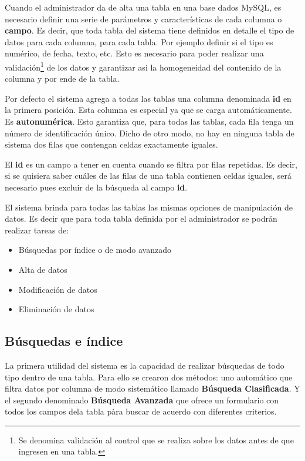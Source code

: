 \documentclass[a4paper,10pt]{article}
\begin{document}
Cuando el administrador da de alta una tabla en una base dados MySQL, es necesario definir una serie de parámetros y características de cada columna o \textbf{campo}. Es decir, que toda tabla del sistema tiene  definidos en detalle el tipo de datos para cada columna, para cada tabla. Por ejemplo definir si el tipo es numérico, de fecha, texto, etc. Esto es necesario para poder realizar una validación\footnote{Se denomina validación al control que se realiza sobre los datos antes de que ingresen en una tabla.} de los datos y garantizar asi la homogeneidad del contenido de la columna y por ende de la tabla.

Por defecto el sistema agrega a todas las tablas una columna denominada \textbf{id} en la primera posición. Esta columna es especial ya que se carga automáticamente. Es \textbf{autonumérica}. Esto garantiza que, para todas las tablas, cada fila tenga un número de identificación único. Dicho de otro modo, no hay en ninguna tabla de sistema dos filas que contengan celdas exactamente iguales.

El \textbf{id} es un campo a tener en cuenta cuando se filtra por filas repetidas. Es decir, si se quisiera saber cuáles de las filas de una tabla contienen celdas iguales, será necesario pues excluir de la búsqueda al campo \textbf{id}.

El sistema brinda para todas las tablas las mismas opciones de manipulación de datos. Es decir que para toda tabla definida por el administrador se podrán realizar tareas de:

\begin{itemize}
 \item Búsquedas por índice o de modo avanzado
 \item Alta de datos
 \item Modificación de datos 
 \item Eliminación de datos
\end{itemize}


\subsection{Búsquedas e índice}

La primera utilidad del sistema es la capacidad de realizar búsquedas de todo tipo dentro de una tabla. 
Para ello se crearon dos métodos: uno automático que filtra datos por columna de modo sistemático llamado \textbf{Búsqueda Clasificada}. Y el segundo denominado \textbf{Búsqueda Avanzada} que ofrece un formulario con todos los campos dela tabla pàra buscar de acuerdo con diferentes criterios.
\end{document}
